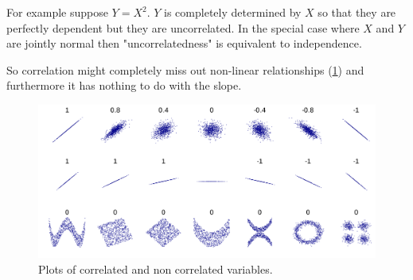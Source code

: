 \documentclass[12pt, letterpaper]{article}
\theoremstyle{definition}
\begin{document}
For example suppose $Y=X^2$. $Y$ is completely determined by $X$ so that they are perfectly dependent but they are uncorrelated.
In the special case where $X$ and $Y$ are jointly normal then "uncorrelatedness" is equivalent to independence.

So correlation might completely miss out non-linear relationships (\ref{corr}) and furthermore it has nothing to do with the slope.
\begin{figure}
\centering
\includegraphics[scale=0.137]{img/corr}
\caption{Plots of correlated and non correlated variables.}
\label{corr}
\end{figure}
\end{document}
